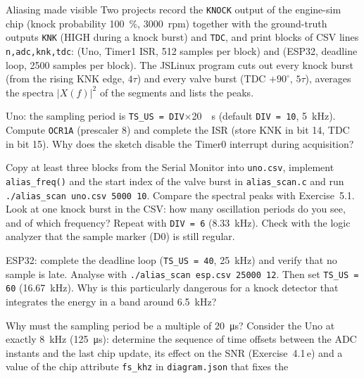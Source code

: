 \begin{exercise}{Aliasing made visible}{\Wokwi}
Two projects record the \texttt{KNOCK} output of the engine-sim chip (knock
probability \SI{100}{\%}, \SI{3000}{rpm}) together with the ground-truth
outputs \texttt{KNK} (HIGH during a knock burst) and \texttt{TDC}, and print
blocks of CSV lines \texttt{n,adc,knk,tdc}:
 (Uno, Timer1 ISR, 512 samples per
block) and  (ESP32, deadline loop,
2500 samples per block). The JSLinux program
 cuts out every knock burst (from the
rising KNK edge, $4\tau$) and every valve burst (TDC $+90^\circ$, $5\tau$),
averages the spectra $|X(f)|^2$ of the segments and lists the peaks.
\begin{tasks}
  \item Uno: the sampling period is \texttt{TS\_US = DIV}$\times$\SI{20}{\micro
    s} (default \texttt{DIV = 10}, \SI{5}{kHz}). Compute \texttt{OCR1A}
    (prescaler 8) and complete the ISR (store KNK in bit 14, TDC in bit 15).
    Why does the sketch disable the Timer0 interrupt during acquisition?
  \item Copy at least three blocks from the Serial Monitor into
    \texttt{uno.csv}, implement \texttt{alias\_freq()} and the start index
    of the valve burst in \texttt{alias\_scan.c} and run
    \texttt{./alias\_scan uno.csv 5000 10}. Compare the spectral peaks with
    Exercise~5.1. Look at one knock burst in the CSV: how many oscillation
    periods do you see, and of which frequency? Repeat with \texttt{DIV = 6}
    (\SI{8.33}{kHz}). Check with the logic analyzer that the sample marker
    (D0) is still regular.
  \item ESP32: complete the deadline loop (\texttt{TS\_US = 40}, \SI{25}{kHz})
    and verify that no sample is late. Analyse with
    \texttt{./alias\_scan esp.csv 25000 12}. Then set \texttt{TS\_US = 60}
    (\SI{16.67}{kHz}). Why is this particularly dangerous for a knock
    detector that integrates the energy in a band around \SI{6.5}{kHz}?
  \item Why must the sampling period be a multiple of \SI{20}{\micro s}?
    Consider the Uno at exactly \SI{8}{kHz} (\SI{125}{\micro s}): determine
    the sequence of time offsets between the ADC instants and the last chip
    update, its effect on the SNR (Exercise~4.1\,e) and a value of the chip
    attribute \texttt{fs\_khz} in \texttt{diagram.json} that fixes the

\end{tasks}
\end{exercise}
